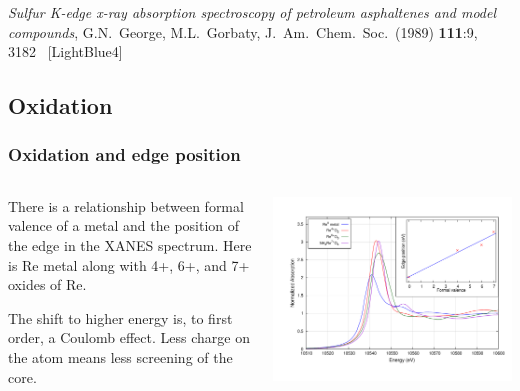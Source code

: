 \documentclass[10pt, xcolor=x11names, compress]{beamer}
\begin{document}
\begin{frame}
\begin{columns}
\begin{column}{0.6\linewidth}
    \end{column}    
  \end{columns}

  \begin{bottomnote}[0.5][19] 
    \textit{Sulfur K-edge x-ray absorption spectroscopy of petroleum
    asphaltenes and model compounds},
    G.N.\ George, M.L.\ Gorbaty,
    J.\ Am.\ Chem.\ Soc.\ (1989) \textbf{111}:9, 3182~
    [LightBlue4]
  \end{bottomnote}
\end{frame}

\subsection{Oxidation}
\begin{frame}
  \frametitle{Oxidation and edge position}

  \small

  \begin{columns}
    \begin{column}{0.4\linewidth}
      There is a relationship between formal valence of a metal and the
      position of the edge in the XANES spectrum.  Here is Re metal along
      with 4+, 6+, and 7+ oxides of Re.

      \smallskip

      The shift to higher energy is, to first order, a Coulomb effect.
      Less charge on the atom means less screening of the core.
    \end{column}
    \begin{column}{0.6\linewidth}
      \includegraphics[width=\linewidth]{images/Re_valence.pdf}
    \end{column}
  \end{columns}
  


\end{frame}
\end{document}
